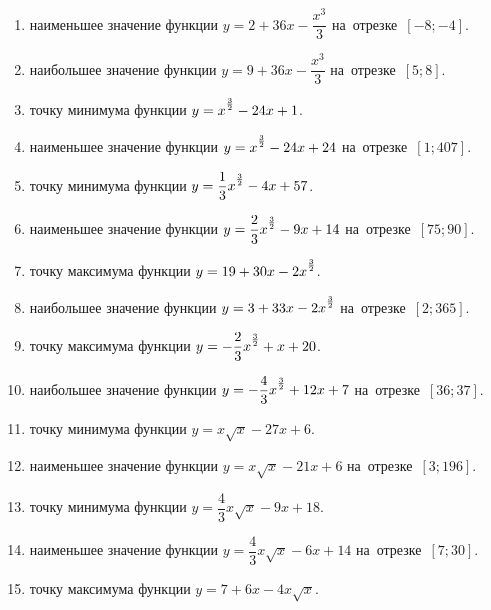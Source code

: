 \documentclass[a4paper,10pt]{article}
\begin{document}
\begin{enumerate}
\item {} наименьшее значение функции $y=2 +36x-\dfrac{x^3}{3}$ на~отрезке~$\left[-8;-4\right]$.

\item {} наибольшее значение функции $y=9 +36x-\dfrac{x^3}{3}$ на~отрезке~$\left[5;8\right]$.

\item {} точку минимума функции $y=x\strut^{\frac{3}{2}} -24x+1$.

\item {} наименьшее значение функции $y=x\strut^{\frac{3}{2}} -24x+24$ на~отрезке~$\left[1;407\right]$.

\item {} точку минимума функции $y=\dfrac{1}{3}x\strut^{\frac{3}{2}} -4x+57$.

\item {} наименьшее значение функции $y=\dfrac{2}{3}x\strut^{\frac{3}{2}} -9x+14$ на~отрезке~$\left[75;90\right]$.

\item {} точку максимума функции $y=19+30x-2x\strut^{\frac{3}{2}}$.

\item {} наибольшее значение функции $y=3+33x-2x\strut^{\frac{3}{2}}$ на~отрезке~$\left[2;365\right]$.

\item {} точку максимума функции $y=-\dfrac{2}{3}x\strut^{\frac{3}{2}} +x+20$.

\item {} наибольшее значение функции $y=-\dfrac{4}{3}x\strut^{\frac{3}{2}} +12x+7$ на~отрезке~$\left[36;37\right]$.

\item {} точку минимума функции $y=x\sqrt{x} -27x+6$.

\item {} наименьшее значение функции $y=x\sqrt{x} -21x+6$ на~отрезке~$\left[3;196\right]$.

\item {} точку минимума функции $y=\dfrac{4}{3}x\sqrt{x} -9x+18$.

\item {} наименьшее значение функции $y=\dfrac{4}{3}x\sqrt{x} -6x+14$ на~отрезке~$\left[7;30\right]$.

\item {} точку максимума функции $y=7+6x -4x\sqrt{x}$.


\end{enumerate}
\end{document}

